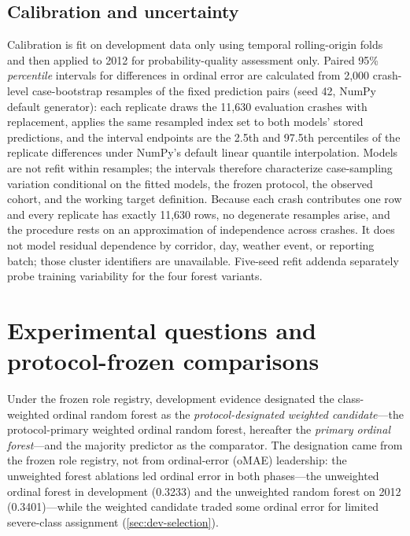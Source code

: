 \documentclass[11pt,letterpaper]{article}
\newcommand{\ORF}{ordinal random forest}
\begin{document}
\subsection{Calibration and uncertainty}
\label{sec:calib}
Calibration is fit on development data only using temporal rolling-origin folds and then applied to 2012 for probability-quality assessment only. Paired 95\% \emph{percentile} intervals for differences in ordinal error are calculated from 2,000 crash-level case-bootstrap resamples of the fixed prediction pairs (seed 42, NumPy default generator): each replicate draws the 11,630 evaluation crashes with replacement, applies the same resampled index set to both models' stored predictions, and the interval endpoints are the 2.5th and 97.5th percentiles of the replicate differences under NumPy's default linear quantile interpolation. Models are not refit within resamples; the intervals therefore characterize case-sampling variation conditional on the fitted models, the frozen protocol, the observed cohort, and the working target definition. Because each crash contributes one row and every replicate has exactly 11,630 rows, no degenerate resamples arise, and the procedure rests on an approximation of independence across crashes. It does not model residual dependence by corridor, day, weather event, or reporting batch; those cluster identifiers are unavailable. Five-seed refit addenda separately probe training variability for the four forest variants.

\section{Experimental questions and protocol-frozen comparisons}
\label{sec:questions}
Under the frozen role registry, development evidence designated the class-weighted \ORF{} as the \emph{protocol-designated weighted candidate}---the protocol-primary weighted \ORF{}, hereafter the \emph{primary ordinal forest}---and the majority predictor as the comparator. The designation came from the frozen role registry, not from ordinal-error (oMAE) leadership: the unweighted forest ablations led ordinal error in both phases---the unweighted ordinal forest in development (0.3233) and the unweighted random forest on 2012 (0.3401)---while the weighted candidate traded some ordinal error for limited severe-class assignment (\cref{sec:dev-selection}).
\end{document}
